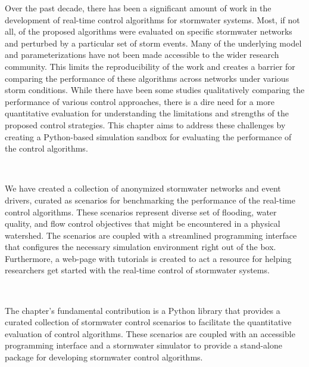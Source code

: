 Over the past decade, there has been a significant amount of work in the development of real-time control algorithms for stormwater systems.
Most, if not all, of the proposed algorithms were evaluated on specific stormwater networks and perturbed by a particular set of storm events.
Many of the underlying model and parameterizations have not been made accessible to the wider research community.
This limits the reproducibility of the work and creates a barrier for comparing the performance of these algorithms across networks under various storm conditions.
While there have been some studies qualitatively comparing the performance of various control approaches, there is a dire need for a more quantitative evaluation for understanding the limitations and strengths of the proposed control strategies.
This chapter aims to address these challenges by creating a Python-based simulation sandbox for evaluating the performance of the control algorithms.

\

We have created a collection of anonymized stormwater networks and event drivers, curated as scenarios for benchmarking the performance of the real-time control algorithms.
These scenarios represent diverse set of flooding, water quality, and flow control objectives that might be encountered in a physical watershed.
The scenarios are coupled with a streamlined programming interface that configures the necessary simulation environment right out of the box.
Furthermore, a web-page with tutorials is created to act a resource for helping researchers get started with the real-time control of stormwater systems.

\

The chapter's fundamental contribution is a Python library that provides a curated collection of stormwater control scenarios to facilitate the quantitative evaluation of control algorithms. These scenarios are coupled with an accessible programming interface and a stormwater simulator to provide a stand-alone package for developing stormwater control algorithms.

